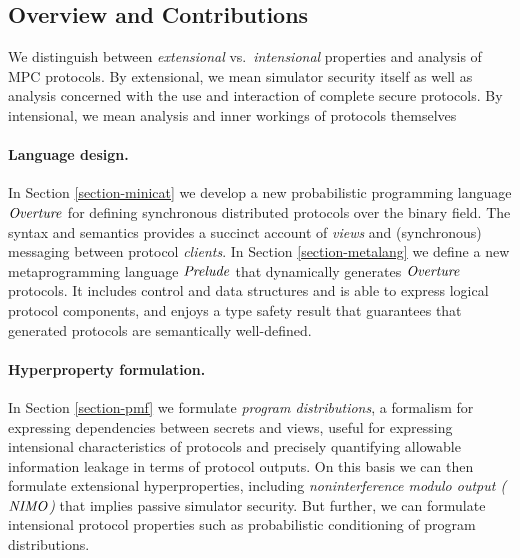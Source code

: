 \subsection{Overview and Contributions}

We distinguish between \emph{extensional} vs.~\emph{intensional}
properties and analysis of MPC protocols. By extensional, we mean
simulator security itself as well as analysis concerned with the use
and interaction of complete secure protocols. By intensional, we mean
analysis and inner workings of protocols themselves

\paragraph{Language design.} In Section \ref{section-minicat} we
develop a new probabilistic programming language $\mathit{Overture}$ for
defining synchronous distributed protocols over the binary field. The
syntax and semantics provides a succinct account of \emph{views} and
(synchronous) messaging between protocol \emph{clients}. In Section
\ref{section-metalang} we define a new metaprogramming language
$\mathit{Prelude}$ that dynamically generates $\mathit{Overture}$ protocols. It
includes control and data structures and is able to express logical
protocol components, and enjoys a type safety result that guarantees
that generated protocols are semantically well-defined.

\paragraph{Hyperproperty formulation.} In Section \ref{section-pmf} we
formulate \emph{program distributions}, a formalism for expressing
dependencies between secrets and views, useful for expressing
intensional characteristics of protocols and precisely quantifying
allowable information leakage in terms of protocol outputs. On this
basis we can then formulate extensional hyperproperties, including
\emph{noninterference modulo output ($\mathit{NIMO}$)} that implies passive
simulator security. But further, we can formulate intensional
protocol properties such as probabilistic conditioning of program
distributions.

